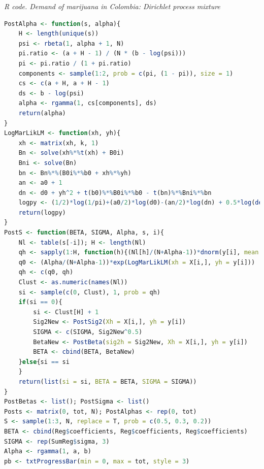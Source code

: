 \begin{tcolorbox}[enhanced,width=4.67in,center upper,
	fontupper=\large\bfseries,drop shadow southwest,sharp corners]
	\textit{R code. Demand of marijuana in Colombia: Dirichlet process mixture}
	\begin{VF}
		\begin{lstlisting}[language=R]
PostAlpha <- function(s, alpha){
	H <- length(unique(s))
	psi <- rbeta(1, alpha + 1, N)
	pi.ratio <- (a + H - 1) / (N * (b - log(psi)))
	pi <- pi.ratio / (1 + pi.ratio)
	components <- sample(1:2, prob = c(pi, (1 - pi)), size = 1)
	cs <- c(a + H, a + H - 1)
	ds <- b - log(psi)
	alpha <- rgamma(1, cs[components], ds)
	return(alpha)
}
LogMarLikLM <- function(xh, yh){
	xh <- matrix(xh, k, 1)
	Bn <- solve(xh%*%t(xh) + B0i)
	Bni <- solve(Bn)
	bn <- Bn%*%(B0i%*%b0 + xh%*%yh)
	an <- a0 + 1
	dn <- d0 + yh^2 + t(b0)%*%B0i%*%b0 - t(bn)%*%Bni%*%bn 
	logpy <- (1/2)*log(1/pi)+(a0/2)*log(d0)-(an/2)*log(dn) + 0.5*log(det(Bn)/det(B0)) + lgamma(an/2)-lgamma(a0/2)
	return(logpy)
}
PostS <- function(BETA, SIGMA, Alpha, s, i){
	Nl <- table(s[-i]); H <- length(Nl)
	qh <- sapply(1:H, function(h){(Nl[h]/(N+Alpha-1))*dnorm(y[i], mean = t(X[i,])%*%BETA[,h], sd = SIGMA[h])})
	q0 <- (Alpha/(N+Alpha-1))*exp(LogMarLikLM(xh = X[i,], yh = y[i]))
	qh <- c(q0, qh)
	Clust <- as.numeric(names(Nl))
	si <- sample(c(0, Clust), 1, prob = qh)
	if(si == 0){
		si <- Clust[H] + 1
		Sig2New <- PostSig2(Xh = X[i,], yh = y[i])
		SIGMA <- c(SIGMA, Sig2New^0.5)
		BetaNew <- PostBeta(sig2h = Sig2New, Xh = X[i,], yh = y[i])
		BETA <- cbind(BETA, BetaNew)
	}else{si == si
	}
	return(list(si = si, BETA = BETA, SIGMA = SIGMA))
}
PostBetas <- list(); PostSigma <- list()
Posts <- matrix(0, tot, N); PostAlphas <- rep(0, tot)
S <- sample(1:3, N, replace = T, prob = c(0.5, 0.3, 0.2))
BETA <- cbind(Reg$coefficients, Reg$coefficients, Reg$coefficients)
SIGMA <- rep(SumReg$sigma, 3)
Alpha <- rgamma(1, a, b)
pb <- txtProgressBar(min = 0, max = tot, style = 3)
\end{lstlisting}
	\end{VF}
\end{tcolorbox}

